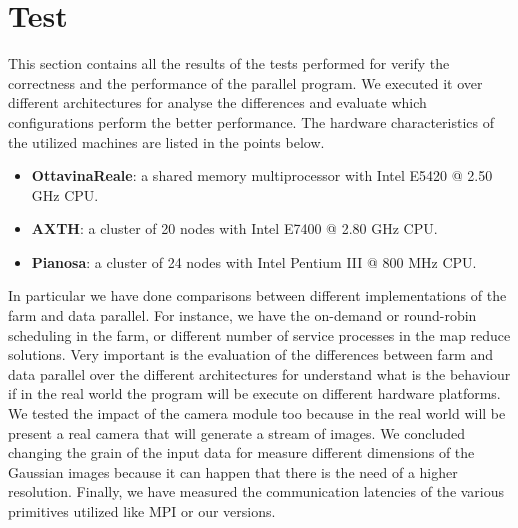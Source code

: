 \section{Test}

This section contains all the results of the tests performed for verify the correctness and the performance of the parallel program. We executed it over different architectures for analyse the differences and evaluate which configurations perform the better performance. The hardware characteristics of the utilized machines are listed in the points below. 
\begin{itemize}
\item \textbf{OttavinaReale}: a shared memory multiprocessor with Intel E5420 @ 2.50 GHz CPU.
\item \textbf{AXTH}: a cluster of 20 nodes with Intel E7400 @ 2.80 GHz CPU.
\item \textbf{Pianosa}: a cluster of 24 nodes with Intel Pentium III @ 800 MHz CPU.
\end{itemize}

In particular we have done comparisons between different implementations of the farm and data parallel. For instance, we have the on-demand or round-robin scheduling in the farm, or different number of service processes in the map reduce solutions. Very important is the evaluation of the differences between farm and data parallel over the different architectures for understand what is the behaviour if in the real world the program will be execute on different hardware platforms. We tested the impact of the camera module too because in the real world will be present a real camera that will generate a stream of images. We concluded changing the grain of the input data for measure different dimensions of the Gaussian images because it can happen that there is the need of a higher resolution. Finally, we have measured the communication latencies of the various primitives utilized like MPI or our versions.

